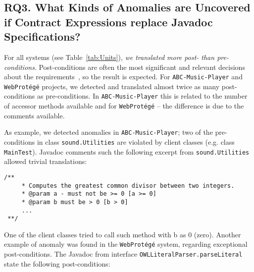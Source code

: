 \subsection{RQ3. What Kinds of Anomalies are Uncovered if Contract Expressions replace Javadoc Specifications?}
\label{rq3}


For all systems (see Table~\ref{tab:Units}), \emph{we
translated more post- than pre-conditions}. 
Post-conditions are often the most significant and relevant decisions about the requirements~\cite{Rosenblum,sac2017}, so the result is expected. 
For \texttt{ABC-Music-Player} and
\texttt{WebProt\'{e}g\'{e}} projects, we detected and translated almost twice as many post-conditions as pre-conditions.
In \texttt{ABC-Music-Player} this is related to the number of accessor methods available and for \texttt{WebProt\'{e}g\'{e}} -- the difference is due to the comments available.





As example, we detected anomalies in \texttt{ABC-Mu\-sic-Player}; two of the pre-conditions in class \texttt{sound.Utilities} are violated by client classes (e.g. class \texttt{MainTest}). Javadoc comments such the following excerpt from \texttt{sound.Utilities} allowed trivial translations:
\begin{lstlisting}[basicstyle=\footnotesize\ttfamily,name=figxpi, frame=lines, mathescape=true]
 /**
     * Computes the greatest common divisor between two integers.
     * @param a - must not be >= 0 [a >= 0]
     * @param b must be > 0 [b > 0]
     ...
 **/  
\end{lstlisting}

One of the client classes tried to call such method with b as $0$ (zero). Another example of anomaly was found in the \texttt{WebProt\'{e}g\'{e}} system, regarding exceptional post-conditions. 
The Javadoc from interface \texttt{OWLLiteralParser.parseLiteral} state the following post-conditions:

